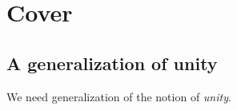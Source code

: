 \section{Cover}

\subsection{A generalization of unity}
We need generalization of the notion of \emph{unity}.